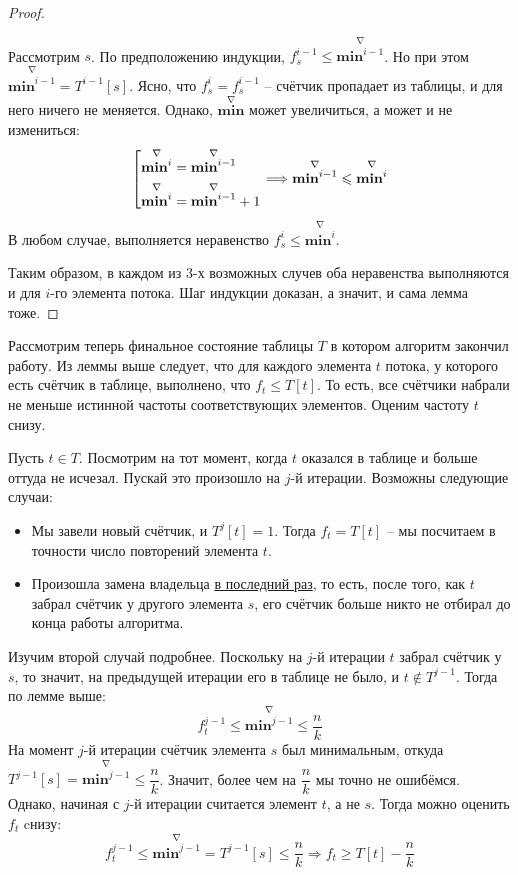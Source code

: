 \documentclass[a4paper,12pt]{article}
\begin{document}
\begin{proof}
\begin{enumerate}
        Рассмотрим $s$. По предположению индукции, $f_s^{i - 1} \leqslant\overset{\nabla}{\textbf{min}^{i - 1}}$. Но при этом $\overset{\nabla}{\textbf{min}^{i - 1}} = T^{i - 1}[s]$. Ясно, что $f_s^i = f_s^{i - 1}$ -- счётчик пропадает из таблицы, и для него ничего не меняется. Однако, $\overset{\nabla}{\textbf{min}}$ может увеличиться, а может и не измениться:
        \[\left[\begin{gathered}\overset{\nabla}{\textbf{min}^{i}} = \overset{\nabla}{\textbf{min}^{i - 1}}\hfill \\ \overset{\nabla}{\textbf{min}^{i}} = \overset{\nabla}{\textbf{min}^{i - 1}} + 1\hfill\end{gathered}\right. \Longrightarrow \overset{\nabla}{\textbf{min}^{i - 1}} \leqslant \overset{\nabla}{\textbf{min}^{i}}\]
        В любом случае, выполняется неравенство $f_s^i \leqslant\overset{\nabla}{\textbf{min}^{i}}$.
        
    \end{enumerate}
    
    Таким образом, в каждом из 3-х возможных случев оба неравенства выполняются и для $i$-го элемента потока. Шаг индукции доказан, а значит, и сама лемма тоже.
\end{proof}

Рассмотрим теперь финальное состояние таблицы $T$ в котором алгоритм закончил работу. Из леммы выше следует, что для каждого элемента $t$ потока, у которого есть счётчик в таблице, выполнено, что $f_t \leqslant T[t]$. То есть, все счётчики набрали не меньше истинной частоты соответствующих элементов. Оценим частоту $t$ снизу.

Пусть $t \in T$. Посмотрим на тот момент, когда $t$ оказался в таблице и больше оттуда не исчезал. Пускай это произошло на $j$-й итерации. Возможны следующие случаи:
\begin{itemize}
    \item Мы завели новый счётчик, и $T^j[t] = 1$. Тогда $f_t = T[t]$ -- мы посчитаем в точности число повторений элемента $t$.
    \item Произошла замена владельца \underline{в последний раз}, то есть, после того, как $t$ забрал счётчик у другого элемента $s$, его счётчик больше никто не отбирал до конца работы алгоритма.
\end{itemize}
Изучим второй случай подробнее. Поскольку на $j$-й итерации $t$ забрал счётчик у $s$, то значит, на предыдущей итерации его в таблице не было, и $t \notin T^{j - 1}$. Тогда по лемме выше:
\[f_t^{j - 1} \leqslant \overset{\nabla}{\textbf{min}^{j - 1}}\leqslant \dfrac{n}{k}\]
На момент $j$-й итерации счётчик элемента $s$ был минимальным, откуда $T^{j - 1}[s] = \overset{\nabla}{\textbf{min}^{j - 1}} \leqslant \dfrac{n}{k}$. Значит, более чем на $\dfrac{n}{k}$ мы точно не ошибёмся. Однако, начиная с $j$-й итерации считается элемент $t$, а не $s$. Тогда можно оценить $f_t$ cнизу:
\[f_t^{j - 1} \leqslant \overset{\nabla}{\textbf{min}^{j - 1}}  = T^{j - 1}[s] \leqslant \dfrac{n}{k} \Longrightarrow f_t \geqslant T[t] - \dfrac{n}{k}\]
\end{document}
